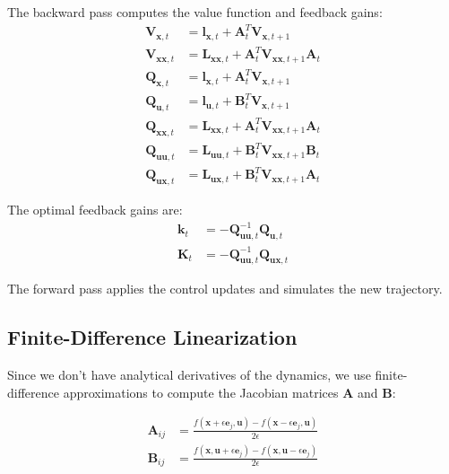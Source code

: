 \documentclass[conference]{IEEEtran}
\begin{document}
The backward pass computes the value function and feedback gains:
\begin{align}
\mathbf{V}_{\mathbf{x},t} &= \mathbf{l}_{\mathbf{x},t} + \mathbf{A}_t^T\mathbf{V}_{\mathbf{x},t+1} \\
\mathbf{V}_{\mathbf{xx},t} &= \mathbf{L}_{\mathbf{xx},t} + \mathbf{A}_t^T\mathbf{V}_{\mathbf{xx},t+1}\mathbf{A}_t \\
\mathbf{Q}_{\mathbf{x},t} &= \mathbf{l}_{\mathbf{x},t} + \mathbf{A}_t^T\mathbf{V}_{\mathbf{x},t+1} \\
\mathbf{Q}_{\mathbf{u},t} &= \mathbf{l}_{\mathbf{u},t} + \mathbf{B}_t^T\mathbf{V}_{\mathbf{x},t+1} \\
\mathbf{Q}_{\mathbf{xx},t} &= \mathbf{L}_{\mathbf{xx},t} + \mathbf{A}_t^T\mathbf{V}_{\mathbf{xx},t+1}\mathbf{A}_t \\
\mathbf{Q}_{\mathbf{uu},t} &= \mathbf{L}_{\mathbf{uu},t} + \mathbf{B}_t^T\mathbf{V}_{\mathbf{xx},t+1}\mathbf{B}_t \\
\mathbf{Q}_{\mathbf{ux},t} &= \mathbf{L}_{\mathbf{ux},t} + \mathbf{B}_t^T\mathbf{V}_{\mathbf{xx},t+1}\mathbf{A}_t
\end{align}

The optimal feedback gains are:
\begin{align}
\mathbf{k}_t &= -\mathbf{Q}_{\mathbf{uu},t}^{-1}\mathbf{Q}_{\mathbf{u},t} \\
\mathbf{K}_t &= -\mathbf{Q}_{\mathbf{uu},t}^{-1}\mathbf{Q}_{\mathbf{ux},t}
\end{align}

The forward pass applies the control updates and simulates the new trajectory.

\subsection{Finite-Difference Linearization}

Since we don't have analytical derivatives of the dynamics, we use finite-difference approximations to compute the Jacobian matrices $\mathbf{A}$ and $\mathbf{B}$:

\begin{align}
\mathbf{A}_{ij} &= \frac{f(\mathbf{x} + \epsilon\mathbf{e}_j, \mathbf{u}) - f(\mathbf{x} - \epsilon\mathbf{e}_j, \mathbf{u})}{2\epsilon} \\
\mathbf{B}_{ij} &= \frac{f(\mathbf{x}, \mathbf{u} + \epsilon\mathbf{e}_j) - f(\mathbf{x}, \mathbf{u} - \epsilon\mathbf{e}_j)}{2\epsilon}
\end{align}
\end{document}
